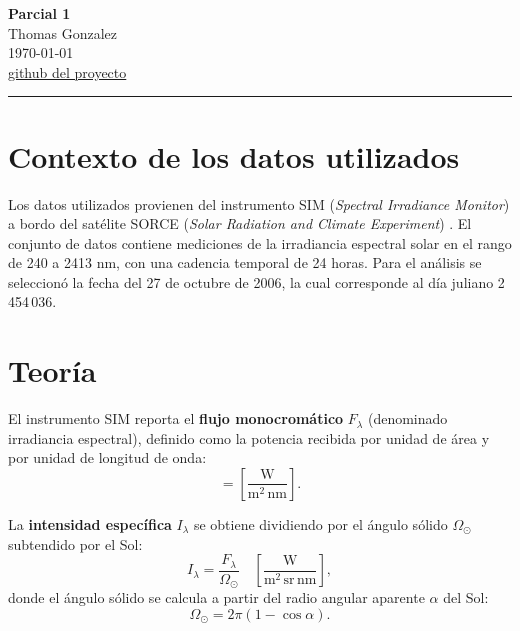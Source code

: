 \documentclass[12pt, a4paper]{article}
\begin{document}
\begin{center}
    {\LARGE\bfseries Parcial 1}\\[0.8em]
    {\large Thomas Gonzalez}\\[0.3em]
    {\normalsize \today}\\[0.4em]
    {\small \href{https://github.com/thomatrixting/Solar_espectrum_analisis}{github del proyecto}}
\end{center}

\vspace{1em}
\hrule
\vspace{1.5em}

\section{Contexto de los datos utilizados}

Los datos utilizados provienen del instrumento SIM (\textit{Spectral Irradiance Monitor}) a bordo del satélite SORCE (\textit{Solar Radiation and Climate Experiment}) \cite{GESDISCDataseta}. El conjunto de datos contiene mediciones de la irradiancia espectral solar en el rango de 240 a 2413 nm, con una cadencia temporal de 24 horas. Para el análisis se seleccionó la fecha del 27 de octubre de 2006, la cual corresponde al día juliano 2\,454\,036.

\section{Teoría}

El instrumento SIM reporta el \textbf{flujo monocromático} $F_\lambda$ (denominado irradiancia espectral), definido como la potencia recibida por unidad de área y por unidad de longitud de onda:
\begin{equation}
    [F_\lambda] = \left[\frac{\mathrm{W}}{\mathrm{m}^2\,\mathrm{nm}}\right].
\end{equation}

La \textbf{intensidad específica} $I_\lambda$ se obtiene dividiendo por el ángulo sólido $\Omega_\odot$ subtendido por el Sol:
\begin{equation}
    I_\lambda = \frac{F_\lambda}{\Omega_\odot}
    \quad \left[\frac{\mathrm{W}}{\mathrm{m}^2\,\mathrm{sr}\,\mathrm{nm}}\right],
\end{equation}
donde el ángulo sólido se calcula a partir del radio angular aparente $\alpha$ del Sol:
\begin{equation}
    \Omega_\odot = 2\pi\left(1 - \cos\alpha\right).
\end{equation}
\end{document}
